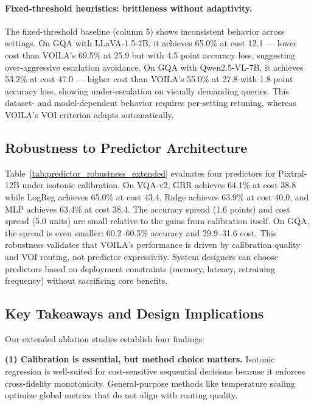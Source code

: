 \paragraph{Fixed-threshold heuristics: brittleness without adaptivity.}
The fixed-threshold baseline (column 5) shows inconsistent behavior across settings.
On GQA with LLaVA-1.5-7B, it achieves 65.0\% at cost 12.1 --- lower cost than \textsc{VOILA}'s 69.5\% at 25.9 but with 4.5 point accuracy loss, suggesting over-aggressive escalation avoidance.
On GQA with Qwen2.5-VL-7B, it achieves 53.2\% at cost 47.0 --- higher cost than \textsc{VOILA}'s 55.0\% at 27.8 with 1.8 point accuracy loss, showing under-escalation on visually demanding queries.
This dataset- and model-dependent behavior requires per-setting retuning, whereas \textsc{VOILA}'s VOI criterion adapts automatically.

\subsection{Robustness to Predictor Architecture}
\label{sec:predictor_robustness}

Table~\ref{tab:predictor_robustness_extended} evaluates four predictors for Pixtral-12B under isotonic calibration.
On VQA-v2, GBR achieves 64.1\% at cost 38.8 while LogReg achieves 65.0\% at cost 43.4, Ridge achieves 63.9\% at cost 40.0, and MLP achieves 63.4\% at cost 38.4.
The accuracy spread (1.6 points) and cost spread (5.0 units) are small relative to the gains from calibration itself.
On GQA, the spread is even smaller: 60.2--60.5\% accuracy and 29.9--31.6 cost.
This robustness validates that \textsc{VOILA}'s performance is driven by calibration quality and VOI routing, not predictor expressivity.
System designers can choose predictors based on deployment constraints (memory, latency, retraining frequency) without sacrificing core benefits.

\subsection{Key Takeaways and Design Implications}
\label{sec:takeaways}

Our extended ablation studies establish four findings:

\textbf{(1) Calibration is essential, but method choice matters.}
Isotonic regression is well-suited for cost-sensitive sequential decisions because it enforces cross-fidelity monotonicity.
General-purpose methods like temperature scaling optimize global metrics that do not align with routing quality.

